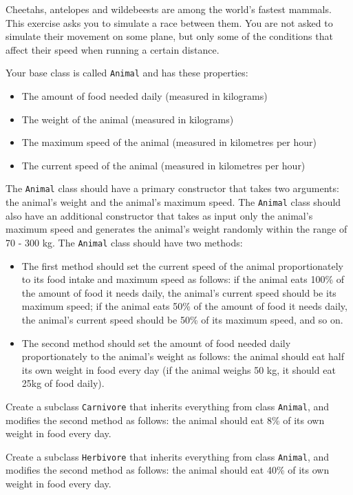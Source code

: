 Cheetahs, antelopes and wildebeests are among the world's fastest mammals. This exercise asks you to simulate a race between them. You are not asked to simulate their movement on some plane, but only some of the conditions that affect their speed when running a certain distance. 
  
  Your base class is called \texttt{Animal} and has these properties: 
  \begin{itemize}
  \item The amount of food needed daily (measured in kilograms)
  \item The weight of the animal (measured in kilograms)
  \item The maximum speed of the animal (measured in kilometres per hour)
  \item The current speed of the animal (measured in kilometres per hour)
  \end{itemize}
  The \texttt{Animal} class should have a primary constructor that takes two arguments: the animal's weight and the animal's maximum speed. The \texttt{Animal} class should also have an additional constructor that takes as input only the animal's maximum speed and generates the animal's weight randomly within the range of 70 - 300 kg. The \texttt{Animal} class should have two methods:
  \begin{itemize}
  \item The first method should set the current speed of the animal proportionately to its food intake and maximum speed as follows: if the animal eats 100\% of the amount of food it needs daily, the animal's current speed should be its maximum speed; if the animal eats 50\% of the amount of food it needs daily, the animal's current speed should be 50\% of its maximum speed, and so on.
  \item The second method should set the amount of food needed daily proportionately to the animal's weight as follows: the animal should eat half its own weight in food every day (if the animal weighs 50 kg, it should eat 25kg of food daily).
  \end{itemize}
  
  
  Create a subclass \texttt{Carnivore} that inherits everything from class \texttt{Animal}, and modifies the second method as follows: the animal should eat 8\% of its own weight in food every day.
  
  Create a subclass \texttt{Herbivore} that inherits everything from class \texttt{Animal}, and modifies the second method as follows: the animal should eat 40\% of its own weight in food every day.
  
